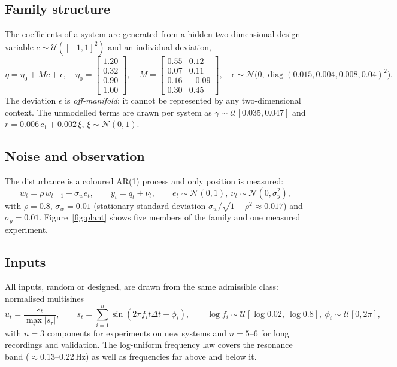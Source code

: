 \documentclass[11pt,a4paper]{article}
\newcommand{\N}{\mathcal{N}}
\begin{document}
\subsection{Family structure}
The coefficients of a system are generated from a hidden two-dimensional design variable
$c\sim\mathcal U([-1,1]^2)$ and an individual deviation,
\begin{equation}\label{eq:family}
  \eta = \eta_0 + M c + \epsilon,\quad
  \eta_0 = \begin{bmatrix}1.20\\0.32\\0.90\\1.00\end{bmatrix},\quad
  M = \begin{bmatrix}0.55&0.12\\0.07&0.11\\0.16&-0.09\\0.30&0.45\end{bmatrix},\quad
  \epsilon\sim\N\!\big(0,\operatorname{diag}(0.015,0.004,0.008,0.04)^2\big).
\end{equation}
The deviation $\epsilon$ is \emph{off-manifold}: it cannot be represented by any two-dimensional
context. The unmodelled terms are drawn per system as $\gamma\sim\mathcal U[0.035,0.047]$ and
$r = 0.006\,c_1 + 0.002\,\xi$, $\xi\sim\N(0,1)$.

\subsection{Noise and observation}
The disturbance is a coloured AR(1) process and only position is measured:
\begin{equation}
  w_t = \rho\, w_{t-1} + \sigma_w e_t,\qquad y_t = q_t + \nu_t,\qquad
  e_t\sim\N(0,1),\ \nu_t\sim\N(0,\sigma_y^2),
\end{equation}
with $\rho=0.8$, $\sigma_w=0.01$ (stationary standard deviation $\sigma_w/\sqrt{1-\rho^2}\approx0.017$)
and $\sigma_y = 0.01$. Figure~\ref{fig:plant} shows five members of the family and one measured
experiment.

\subsection{Inputs}
All inputs, random or designed, are drawn from the same admissible class: normalised multisines
\begin{equation}\label{eq:multisine}
  u_t = \frac{s_t}{\max_\tau |s_\tau|},\qquad s_t = \sum_{i=1}^{n}\sin(2\pi f_i t\Delta t + \phi_i),\qquad
  \log f_i\sim\mathcal U[\log 0.02,\ \log 0.8],\ \phi_i\sim\mathcal U[0,2\pi],
\end{equation}
with $n=3$ components for experiments on new systems and $n=5$--$6$ for long recordings and
validation. The log-uniform frequency law covers the resonance band ($\approx$0.13--0.22\,Hz)
as well as frequencies far above and below it.
\end{document}
